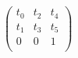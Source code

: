\documentclass{article}
\begin{document}
$ \begin{pmatrix} t_{0} & t_{2} & t_{4} \\ t_{1} & t_{3} & t_{5} \\ 0 & 0 & 1 \\ \end{pmatrix} $
\pagebreak
\end{document}
